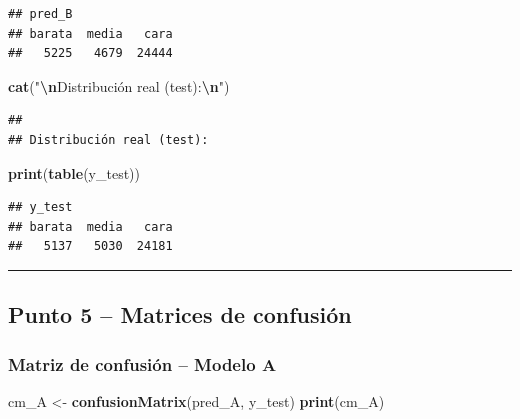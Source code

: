 \documentclass[
]{article}
\newenvironment{Shaded}{\begin{snugshade}}{\end{snugshade}}
\newcommand{\FunctionTok}[1]{\textcolor[rgb]{0.13,0.29,0.53}{\textbf{#1}}}
\newcommand{\NormalTok}[1]{#1}
\newcommand{\OtherTok}[1]{\textcolor[rgb]{0.56,0.35,0.01}{#1}}
\newcommand{\SpecialCharTok}[1]{\textcolor[rgb]{0.81,0.36,0.00}{\textbf{#1}}}
\newcommand{\StringTok}[1]{\textcolor[rgb]{0.31,0.60,0.02}{#1}}
\begin{document}
\begin{verbatim}
## pred_B
## barata  media   cara 
##   5225   4679  24444
\end{verbatim}

\begin{Shaded}
\begin{Highlighting}[]
\FunctionTok{cat}\NormalTok{(}\StringTok{"}\SpecialCharTok{\textbackslash{}n}\StringTok{Distribución real (test):}\SpecialCharTok{\textbackslash{}n}\StringTok{"}\NormalTok{)}
\end{Highlighting}
\end{Shaded}

\begin{verbatim}
## 
## Distribución real (test):
\end{verbatim}

\begin{Shaded}
\begin{Highlighting}[]
\FunctionTok{print}\NormalTok{(}\FunctionTok{table}\NormalTok{(y\_test))}
\end{Highlighting}
\end{Shaded}

\begin{verbatim}
## y_test
## barata  media   cara 
##   5137   5030  24181
\end{verbatim}

\begin{center}\rule{0.5\linewidth}{0.5pt}\end{center}

\hypertarget{punto-5-matrices-de-confusiuxf3n}{%
\subsection{Punto 5 -- Matrices de
confusión}\label{punto-5-matrices-de-confusiuxf3n}}

\hypertarget{matriz-de-confusiuxf3n-modelo-a}{%
\subsubsection{Matriz de confusión -- Modelo
A}\label{matriz-de-confusiuxf3n-modelo-a}}

\begin{Shaded}
\begin{Highlighting}[]
\NormalTok{cm\_A }\OtherTok{\textless{}{-}} \FunctionTok{confusionMatrix}\NormalTok{(pred\_A, y\_test)}
\FunctionTok{print}\NormalTok{(cm\_A)}
\end{Highlighting}
\end{Shaded}
\end{document}
